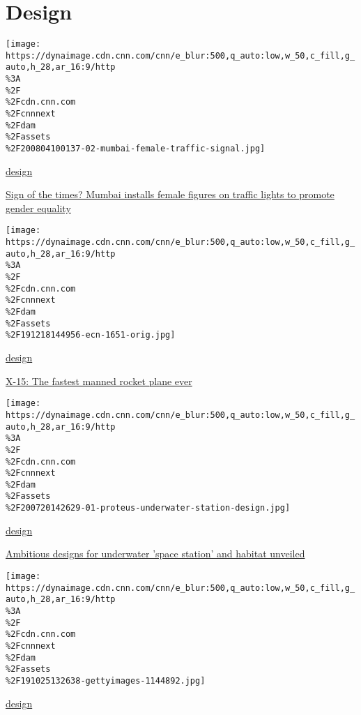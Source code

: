 \href{/}{}\href{/style}{}

\hypertarget{design}{%
\section{Design}\label{design}}

\href{/style/article/mumbai-traffic-light-women-intl-hnk-scli/index.html}{}

\texttt{[image: https://dynaimage.cdn.cnn.com/cnn/e\_blur:500,q\_auto:low,w\_50,c\_fill,g\_auto,h\_28,ar\_16:9/http\\\%3A\\\%2F\\\%2Fcdn.cnn.com\\\%2Fcnnnext\\\%2Fdam\\\%2Fassets\\\%2F200804100137-02-mumbai-female-traffic-signal.jpg]}

\href{/style/design}{design}

\href{/style/article/mumbai-traffic-light-women-intl-hnk-scli/index.html}{Sign
of the times? Mumbai installs female figures on traffic lights to
promote gender equality}

\href{/style/article/x-15-rocket-aircraft/index.html}{}

\texttt{[image: https://dynaimage.cdn.cnn.com/cnn/e\_blur:500,q\_auto:low,w\_50,c\_fill,g\_auto,h\_28,ar\_16:9/http\\\%3A\\\%2F\\\%2Fcdn.cnn.com\\\%2Fcnnnext\\\%2Fdam\\\%2Fassets\\\%2F191218144956-ecn-1651-orig.jpg]}

\href{/style/design}{design}

\href{/style/article/x-15-rocket-aircraft/index.html}{X-15: The fastest
manned rocket plane ever}

\href{/style/article/proteus-designs-underwater-space-station-research-center-scn/index.html}{}

\texttt{[image: https://dynaimage.cdn.cnn.com/cnn/e\_blur:500,q\_auto:low,w\_50,c\_fill,g\_auto,h\_28,ar\_16:9/http\\\%3A\\\%2F\\\%2Fcdn.cnn.com\\\%2Fcnnnext\\\%2Fdam\\\%2Fassets\\\%2F200720142629-01-proteus-underwater-station-design.jpg]}

\href{/style/design}{design}

\href{/style/article/proteus-designs-underwater-space-station-research-center-scn/index.html}{Ambitious
designs for underwater 'space station' and habitat unveiled}

\href{/style/article/sr-71-blackbird-spy-plane-design/index.html}{}

\texttt{[image: https://dynaimage.cdn.cnn.com/cnn/e\_blur:500,q\_auto:low,w\_50,c\_fill,g\_auto,h\_28,ar\_16:9/http\\\%3A\\\%2F\\\%2Fcdn.cnn.com\\\%2Fcnnnext\\\%2Fdam\\\%2Fassets\\\%2F191025132638-gettyimages-1144892.jpg]}

\href{/style/design}{design}

